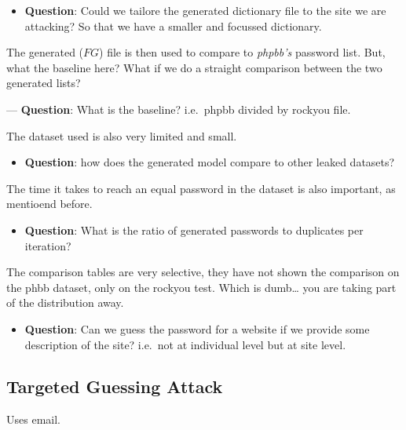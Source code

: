 \begin{itemize}
\item
  \textbf{Question}: Could we tailore the generated dictionary file to
  the site we are attacking? So that we have a smaller and focussed
  dictionary.
\end{itemize}

The generated (\(FG\)) file is then used to compare to \emph{phpbb's}
password list. But, what the baseline here? What if we do a straight
comparison between the two generated lists?

--- \textbf{Question}: What is the baseline? i.e.~phpbb divided by
rockyou file.

The dataset used is also very limited and small.

\begin{itemize}
\item
  \textbf{Question}: how does the generated model compare to other
  leaked datasets?
\end{itemize}

The time it takes to reach an equal password in the dataset is also
important, as mentioend before.

\begin{itemize}
\item
  \textbf{Question}: What is the ratio of generated passwords to
  duplicates per iteration?
\end{itemize}

The comparison tables are very selective, they have not shown the
comparison on the phbb dataset, only on the rockyou test. Which is
dumb\ldots{} you are taking part of the distribution away.

\begin{itemize}
\item
  \textbf{Question}: Can we guess the password for a website if we
  provide some description of the site? i.e.~not at individual level but
  at site level.
\end{itemize}

\hypertarget{targeted-guessing-attack}{%
\subsection{Targeted Guessing Attack}\label{targeted-guessing-attack}}
\cite{salimbeni_your_2023} Uses email.
